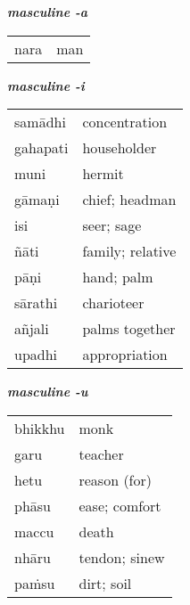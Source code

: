 \documentclass[11pt,oneside]{memoir}
\begin{document}
\begin{multicols}{3}
{\centering\textit{\textbf{masculine -a}}\par}

\begin{center}
\begin{tabular}{ll}
nara & man\\[0pt]
\end{tabular}
\end{center}

\columnbreak
{\centering\textit{\textbf{masculine -i}}\par}

\begin{center}
\begin{tabular}{ll}
samādhi & concentration\\[0pt]
gahapati & householder\\[0pt]
muni & hermit\\[0pt]
gāmaṇi & chief; headman\\[0pt]
isi & seer; sage\\[0pt]
ñāti & family; relative\\[0pt]
pāṇi & hand; palm\\[0pt]
sārathi & charioteer\\[0pt]
añjali & palms together\\[0pt]
upadhi & appropriation\\[0pt]
\end{tabular}
\end{center}

\columnbreak
{\centering\textit{\textbf{masculine -u}}\par}

\begin{center}
\begin{tabular}{ll}
bhikkhu & monk\\[0pt]
garu & teacher\\[0pt]
hetu & reason (for)\\[0pt]
phāsu & ease; comfort\\[0pt]
maccu & death\\[0pt]
nhāru & tendon; sinew\\[0pt]
paṁsu & dirt; soil\\[0pt]
\end{tabular}
\end{center}

\end{multicols}

\bigskip
\end{document}
